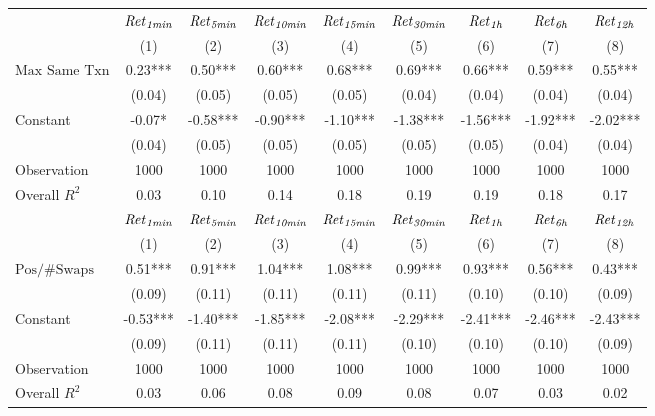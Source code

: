 \begin{tabular}{lcccccccc}
\hline
 & ${\it Ret}_{\it 1min}$ & ${\it Ret}_{\it 5min}$ & ${\it Ret}_{\it 10min}$ & ${\it Ret}_{\it 15min}$ & ${\it Ret}_{\it 30min}$ & ${\it Ret}_{\it 1h}$ & ${\it Ret}_{\it 6h}$ & ${\it Ret}_{\it 12h}$ \\
 & (1) & (2) & (3) & (4) & (5) & (6) & (7) & (8) \\
\hline
$\text{Max Same Txn}$ & 0.23*** & 0.50*** & 0.60*** & 0.68*** & 0.69*** & 0.66*** & 0.59*** & 0.55*** \\
 & (0.04) & (0.05) & (0.05) & (0.05) & (0.04) & (0.04) & (0.04) & (0.04) \\
Constant & -0.07* & -0.58*** & -0.90*** & -1.10*** & -1.38*** & -1.56*** & -1.92*** & -2.02*** \\
 & (0.04) & (0.05) & (0.05) & (0.05) & (0.05) & (0.05) & (0.04) & (0.04) \\
Observation & 1000 & 1000 & 1000 & 1000 & 1000 & 1000 & 1000 & 1000 \\
Overall $R^2$ & 0.03 & 0.10 & 0.14 & 0.18 & 0.19 & 0.19 & 0.18 & 0.17 \\
\hline
 & ${\it Ret}_{\it 1min}$ & ${\it Ret}_{\it 5min}$ & ${\it Ret}_{\it 10min}$ & ${\it Ret}_{\it 15min}$ & ${\it Ret}_{\it 30min}$ & ${\it Ret}_{\it 1h}$ & ${\it Ret}_{\it 6h}$ & ${\it Ret}_{\it 12h}$ \\
 & (1) & (2) & (3) & (4) & (5) & (6) & (7) & (8) \\
\hline
$\text{Pos/\#Swaps}$ & 0.51*** & 0.91*** & 1.04*** & 1.08*** & 0.99*** & 0.93*** & 0.56*** & 0.43*** \\
 & (0.09) & (0.11) & (0.11) & (0.11) & (0.11) & (0.10) & (0.10) & (0.09) \\
Constant & -0.53*** & -1.40*** & -1.85*** & -2.08*** & -2.29*** & -2.41*** & -2.46*** & -2.43*** \\
 & (0.09) & (0.11) & (0.11) & (0.11) & (0.10) & (0.10) & (0.10) & (0.09) \\
Observation & 1000 & 1000 & 1000 & 1000 & 1000 & 1000 & 1000 & 1000 \\
Overall $R^2$ & 0.03 & 0.06 & 0.08 & 0.09 & 0.08 & 0.07 & 0.03 & 0.02 \\
\hline
\end{tabular}
